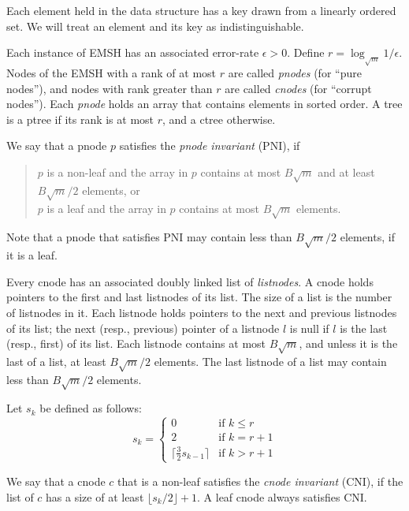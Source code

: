Each element held in the data structure has a key drawn from a 
	linearly ordered set. 
We will treat an element and its key as indistinguishable.

Each instance of EMSH has an associated error-rate $\epsilon>0$. 
Define $r = \log_{\sqrt{m}}{1/\epsilon}$.
Nodes of the EMSH with a rank of at most $r$ are called {\em pnodes} (for ``pure nodes''), and 
	nodes with rank greater than $r$ are called {\em cnodes} (for ``corrupt nodes'').
Each {\em pnode} holds an array that contains elements in sorted order.
A tree is a ptree if its rank is at most $r$, and a ctree otherwise.

We say that a pnode $p$ satisfies the \emph{pnode invariant} (PNI), if 
\begin{quote}
	$p$ is a non-leaf and the array in $p$ contains at most 
	$B\sqrt{m}$ and at least $B\sqrt{m}/2$ elements, or \\
	$p$ is a leaf and the array in $p$ contains at most 
	$B\sqrt{m}$ elements.
\end{quote}
Note that a pnode that satisfies PNI may contain less than $B\sqrt{m}/2$ elements,
	if it is a leaf.

Every cnode has an associated doubly linked list of {\em listnodes}. 
A cnode holds pointers to the first and last listnodes of its list. 
The size of a list is the number of listnodes in it. 
Each listnode holds pointers to the next and previous
	listnodes of its list; the next (resp., previous)
        pointer of a listnode $l$ is null if $l$  is the last (resp., first)
        of its list.
Each listnode contains at most $B\sqrt{m}$, and unless it is the last of a list,
	at least $B\sqrt{m}/2$  elements. 
The last listnode of a list may contain less than $B\sqrt{m}/2$ elements.

Let $s_k$ be defined as follows:
\begin{equation*}
s_k =
 \begin{cases}
 0 & \text{if $k \leq r$} \\
 2 & \text{if $k = r+1$} \\
 \lceil \frac{3}{2} s_{k-1} \rceil & \text{if $k > r+1$}
 \end{cases}
\end{equation*}

We say that a cnode $c$ that is a non-leaf  
	satisfies the \emph{cnode invariant} (CNI), if 
	the list of $c$ has a size of at least $\lfloor s_k/2 \rfloor + 1$. 
A leaf cnode always satisfies CNI. 
	

